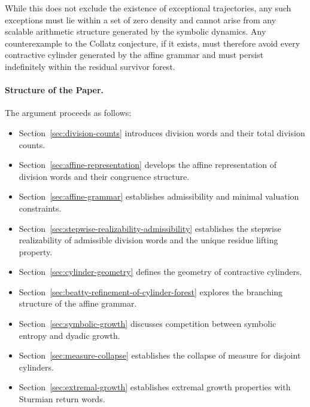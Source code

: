 \documentclass[12pt, oneside]{article}
\numberwithin{equation}{section}
\theoremstyle{definition}
\theoremstyle{plain}
\theoremstyle{remark}
\begin{document}
While this does not exclude the existence of exceptional trajectories, any such
exceptions must lie within a set of zero density and cannot arise from any scalable
arithmetic structure generated by the symbolic dynamics.
Any counterexample to the Collatz conjecture, if it exists, must therefore
avoid every contractive cylinder generated by the affine grammar and must
persist indefinitely within the residual survivor forest.

\paragraph{Structure of the Paper.}
The argument proceeds as follows:
\begin{itemize}
\item Section~\ref{sec:division-counts} introduces division words and their total division counts.
\item Section~\ref{sec:affine-representation} develops the affine representation of division words and their congruence structure.
\item Section~\ref{sec:affine-grammar} establishes admissibility and minimal valuation constraints.
\item Section~\ref{sec:stepwise-realizability-admissibility} establishes the stepwise realizability of admissible division words and the unique residue lifting property.
\item Section~\ref{sec:cylinder-geometry} defines the geometry of contractive cylinders.
\item Section~\ref{sec:beatty-refinement-of-cylinder-forest} explores the branching structure of the affine grammar.
\item Section~\ref{sec:symbolic-growth} discusses competition between symbolic entropy and dyadic growth.
\item Section~\ref{sec:measure-collapse} establishes the collapse of measure for disjoint cylinders.
\item Section~\ref{sec:extremal-growth} establishes extremal growth properties with Sturmian return words.
\end{itemize}
\end{document}

